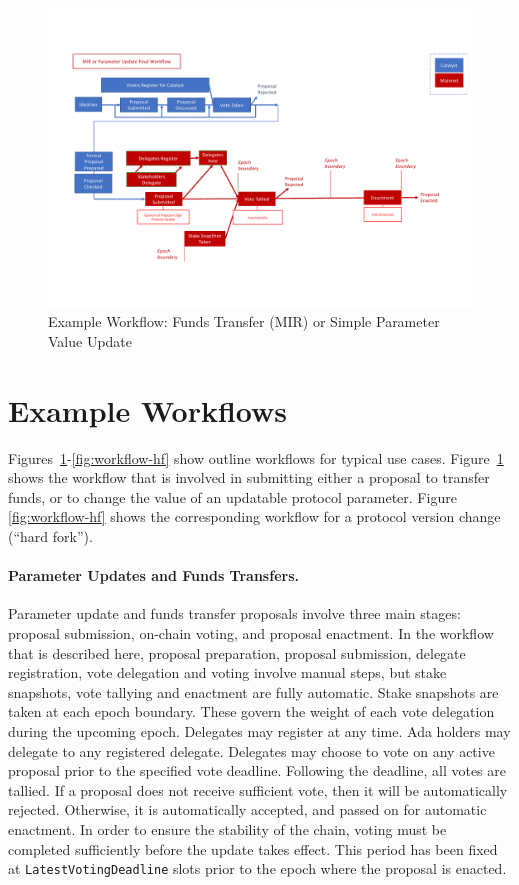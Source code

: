 \begin{figure}
  \includegraphics[trim=0 90 0 80,clip,width=\textwidth]{Workflow1}
  \caption{Example Workflow: Funds Transfer (MIR) or Simple Parameter Value Update}
  \label{fig:workflow-mir}
\end{figure}

\section{Example Workflows}
\label{sec:workflows}

Figures~\ref{fig:workflow-mir}-\ref{fig:workflow-hf} show outline workflows for
typical use cases.  Figure~\ref{fig:workflow-mir} shows the workflow that is
involved in submitting either a proposal to transfer funds, or to change the
value of an updatable protocol parameter.  Figure \ref{fig:workflow-hf} shows
the corresponding workflow for a protocol version change (``hard fork'').

\paragraph{Parameter Updates and Funds Transfers.}  Parameter update and funds transfer proposals involve three main stages:
proposal submission, on-chain voting, and proposal enactment.  In the workflow that is described
here, proposal preparation, proposal submission, delegate registration,
vote delegation and voting involve manual steps, but stake snapshots, vote tallying
and enactment are fully automatic.  Stake snapshots are taken at each epoch boundary.
These govern the weight of each vote delegation during the upcoming epoch.
%
Delegates may register at any time.  Ada holders may delegate to any registered delegate.
Delegates may choose to vote on any active proposal prior to the specified vote deadline.
Following the deadline, all votes are tallied.  If a proposal does not receive sufficient vote, then
it will be automatically rejected.  Otherwise, it is automatically accepted, and passed on for
automatic enactment.
In order to ensure the stability of the chain, voting must be completed sufficiently before the update takes
effect.  This period has been fixed at \texttt{LatestVotingDeadline} slots prior to the epoch where the proposal is enacted.

